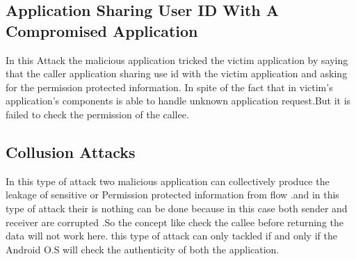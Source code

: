 \documentclass[11pt]{report}
\begin{document}
\subsection{Application Sharing User ID With A Compromised Application}
In this Attack the malicious application tricked the victim application
by saying that the caller application sharing use id with the victim application
and asking for the permission protected information. In spite of the fact that in victim's 
application's components is able to handle unknown application request.But it is failed to check 
the permission of the callee.



\subsection{Collusion Attacks}
In this type of attack two malicious application can collectively produce the leakage of 
sensitive or Permission protected information from flow .and in this type of attack their is nothing can be done because in this case both sender and receiver
are corrupted .So the concept like check the callee before returning the data will not work here.
this type of attack can only tackled if and only if the Android O.S will check the authenticity of both the application.
\end{document}

